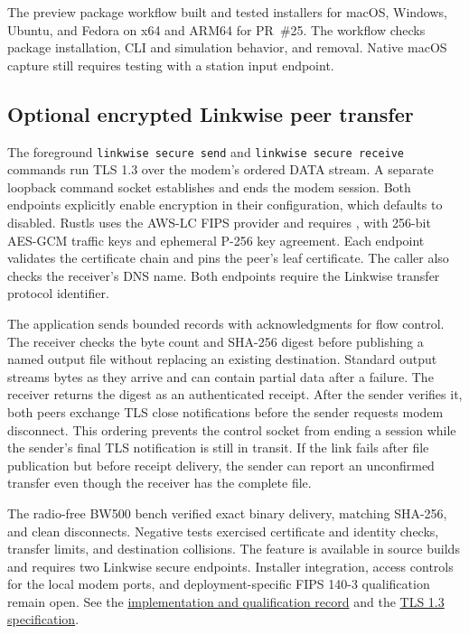 The preview package workflow built and tested installers for macOS, Windows,
Ubuntu, and Fedora on x64 and ARM64 for PR~\#25. The workflow checks package
installation, CLI and simulation behavior, and removal. Native macOS
capture still requires testing with a station input endpoint.

\subsection{Optional encrypted Linkwise peer transfer}
\label{sec:secure-peer-transfer}

The foreground \texttt{linkwise secure send} and \texttt{linkwise secure receive}
commands run TLS 1.3 over the modem's ordered DATA stream. A separate
loopback command socket establishes and ends the modem session. Both
endpoints explicitly enable encryption in their configuration, which defaults
to disabled. Rustls uses the AWS-LC FIPS provider and requires
, with 256-bit AES-GCM traffic keys and ephemeral
P-256 key agreement. Each endpoint validates the certificate chain and pins
the peer's leaf certificate. The caller also checks the receiver's DNS name.
Both endpoints require the Linkwise transfer protocol identifier.

The application sends bounded records with acknowledgments for flow control.
The receiver checks the byte count and SHA-256 digest before publishing a
named output file without replacing an existing destination. Standard output
streams bytes as they arrive and can contain partial data after a failure.
The receiver returns the digest as an authenticated receipt. After the sender
verifies it, both peers exchange TLS close notifications before the sender
requests modem disconnect. This ordering prevents the control socket from
ending a session while the sender's final TLS notification is still in transit.
If the link fails after file publication but before receipt delivery, the
sender can report an unconfirmed transfer even though the receiver has the
complete file.

The radio-free BW500 bench verified exact binary delivery, matching SHA-256,
and clean disconnects. Negative tests exercised certificate and identity
checks, transfer limits, and destination collisions.
The feature is available in source builds and requires two Linkwise secure
endpoints. Installer integration, access controls for the local modem ports,
and deployment-specific FIPS 140-3 qualification remain open.
See the \href{https://github.com/8r4n/linkwise/pull/9}{implementation and
qualification record} and the
\href{https://www.rfc-editor.org/rfc/rfc8446.html}{TLS 1.3 specification}.

